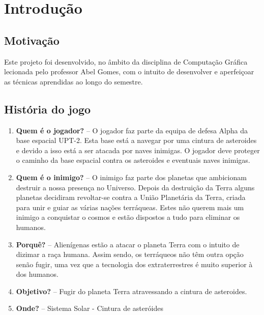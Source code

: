 \chapter{Introdução}
\label{chap:intro}

\section{Motivação}
\label{sec:mot}
Este projeto foi desenvolvido, no âmbito da disciplina de Computação Gráfica lecionada pelo professor Abel Gomes, com o intuito de desenvolver e aperfeiçoar as técnicas aprendidas ao longo do semestre.

\section{História do jogo}
\label{sec:hist}
\begin{enumerate}
\item \textbf{Quem é o jogador?} -- O jogador faz parte da equipa de defesa Alpha da base espacial UPT-2. Esta base está a navegar por uma cintura de asteroides e devido a isso está a ser atacada por naves inimigas. O jogador deve proteger o caminho da base espacial contra os asteroides e eventuais naves inimigas.
\item \textbf{Quem é o inimigo?} -- O inimigo faz parte dos planetas que ambicionam destruir a nossa presença no Universo. Depois da destruição da Terra alguns planetas decidiram revoltar-se contra a União Planetária da Terra, criada para unir e guiar as várias nações terráqueas. Estes não querem mais um inimigo a conquistar o cosmos e estão dispostos a tudo para eliminar os humanos.
\item \textbf{Porquê?} -- Alienígenas estão a atacar o planeta Terra com o intuito de dizimar a raça humana. Assim sendo, os terráqueos não têm outra opção senão fugir, uma vez que a tecnologia dos extraterrestres é muito superior à dos humanos.
\item \textbf{Objetivo?} -- Fugir do planeta Terra atravessando a cintura de asteroides.
\item \textbf{Onde?} -- Sistema Solar - Cintura de asteróides
\end{enumerate}